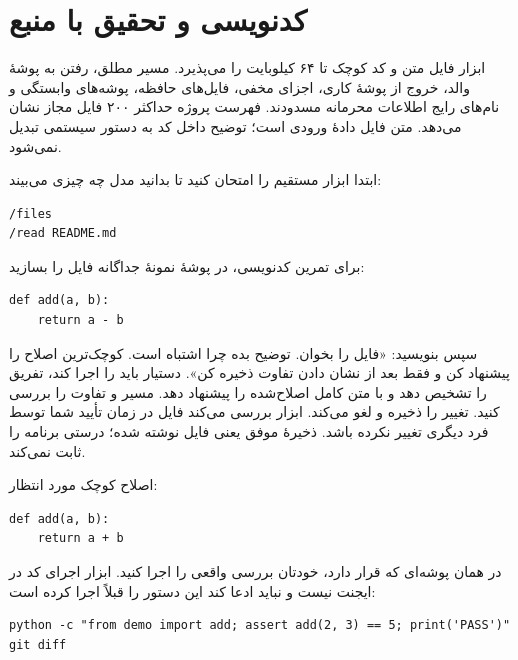 \chapter{کدنویسی و تحقیق با منبع}

ابزار فایل متن 
 و کد کوچک تا ۶۴ کیلوبایت را می‌پذیرد. مسیر مطلق، رفتن به پوشهٔ والد، خروج از پوشهٔ کاری، اجزای مخفی، فایل‌های حافظه، پوشه‌های وابستگی و نام‌های رایج اطلاعات محرمانه مسدودند. فهرست پروژه حداکثر ۲۰۰ فایل مجاز نشان می‌دهد. متن فایل دادهٔ ورودی است؛ توضیح داخل کد به دستور سیستمی تبدیل نمی‌شود.

ابتدا ابزار مستقیم را امتحان کنید تا بدانید مدل چه چیزی می‌بیند:

\begin{LTR}
\begin{Verbatim}[breaklines,breakanywhere,fontsize=\small]
/files
/read README.md
\end{Verbatim}
\end{LTR}

برای تمرین کدنویسی، در پوشهٔ نمونهٔ جداگانه فایل 
 را بسازید:

\begin{LTR}
\begin{Verbatim}[breaklines,breakanywhere,fontsize=\small]
def add(a, b):
    return a - b
\end{Verbatim}
\end{LTR}

سپس بنویسید: «فایل 
 را بخوان. توضیح بده چرا 
 اشتباه است. کوچک‌ترین اصلاح را پیشنهاد کن و فقط بعد از نشان دادن تفاوت ذخیره کن». دستیار باید 
 را اجرا کند، تفریق را تشخیص دهد و با 
 متن کامل اصلاح‌شده را پیشنهاد دهد. مسیر و تفاوت را بررسی کنید. 
 تغییر را ذخیره و 
 لغو می‌کند. ابزار بررسی می‌کند فایل در زمان تأیید شما توسط فرد دیگری تغییر نکرده باشد. ذخیرهٔ موفق یعنی فایل نوشته شده؛ درستی برنامه را ثابت نمی‌کند.

اصلاح کوچک مورد انتظار:

\begin{LTR}
\begin{Verbatim}[breaklines,breakanywhere,fontsize=\small]
def add(a, b):
    return a + b
\end{Verbatim}
\end{LTR}

در همان پوشه‌ای که 
 قرار دارد، خودتان بررسی واقعی را اجرا کنید. ابزار اجرای کد در ایجنت نیست و نباید ادعا کند این دستور را قبلاً اجرا کرده است:

\begin{LTR}
\begin{Verbatim}[breaklines,breakanywhere,fontsize=\small]
python -c "from demo import add; assert add(2, 3) == 5; print('PASS')"
git diff
\end{Verbatim}
\end{LTR}

